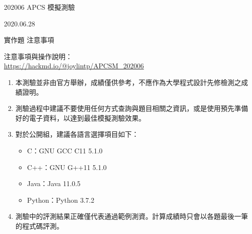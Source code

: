 \documentclass[12pt]{article}
\begin{document}
\renewcommand{\headrulewidth}{0pt}
\cfoot{}
\lhead{}
\chead{}
\rhead{}

\pagestyle{fancy}
\setlength\parindent{24pt}
\setlength\columnseprule{0.5pt}
\newcommand{\parspace}{\vspace{10pt}}
\newcommand{\sectitle}[1]{\parspace\noindent\textbf{#1}}
\raggedcolumns

\LARGE
\begin{center}
    202006 APCS 模擬測驗

    \vspace{15pt}
    2020.06.28
\end{center}
\normalsize

\vspace{80pt}

\Large
\begin{center}
    實作題 \hspace{10pt} 注意事項
\end{center}

\large
\vspace{10pt}

\noindent
注意事項與操作說明：\\
\href{https://hackmd.io/@joylintp/APCSM_202006}{https://hackmd.io/@joylintp/APCSM\_202006}
\begin{enumerate}
    \item 本測驗並非由官方舉辦，成績僅供參考，不應作為大學程式設計先修檢測之成績證明。
    \item 測驗過程中建議不要使用任何方式查詢與題目相關之資訊，或是使用預先準備好的電子資料，以達到最佳模擬測驗效果。
    \item 對於公開組，建議各語言選擇項目如下：
        \begin{itemize}
            \item C：GNU GCC C11 5.1.0
            \item C++：GNU G++11 5.1.0
            \item Java：Java 11.0.5
            \item Python：Python 3.7.2
        \end{itemize}
    \item 測驗中的評測結果正確僅代表通過範例測資。計算成績時只會以各題最後一筆的程式碼評測。
\end{enumerate}

\normalsize

\clearpage

\end{document}
